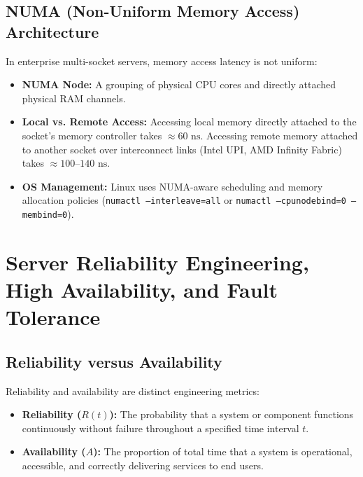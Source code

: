 \subsection{NUMA (Non-Uniform Memory Access) Architecture}
In enterprise multi-socket servers, memory access latency is not uniform:
\begin{itemize}
    \item \textbf{NUMA Node:} A grouping of physical CPU cores and directly attached physical RAM channels.
    \item \textbf{Local vs. Remote Access:} Accessing local memory directly attached to the socket's memory controller takes $\approx 60\text{ ns}$. Accessing remote memory attached to another socket over interconnect links (Intel UPI, AMD Infinity Fabric) takes $\approx 100\text{--}140\text{ ns}$.
    \item \textbf{OS Management:} Linux uses NUMA-aware scheduling and memory allocation policies (\texttt{numactl --interleave=all} or \texttt{numactl --cpunodebind=0 --membind=0}).
\end{itemize}

\section{Server Reliability Engineering, High Availability, and Fault Tolerance}
\label{sec:os_reliability}

\subsection{Reliability versus Availability}
Reliability and availability are distinct engineering metrics:
\begin{itemize}
    \item \textbf{Reliability ($R(t)$):} The probability that a system or component functions continuously without failure throughout a specified time interval $t$.
    \item \textbf{Availability ($A$):} The proportion of total time that a system is operational, accessible, and correctly delivering services to end users.
\end{itemize}

